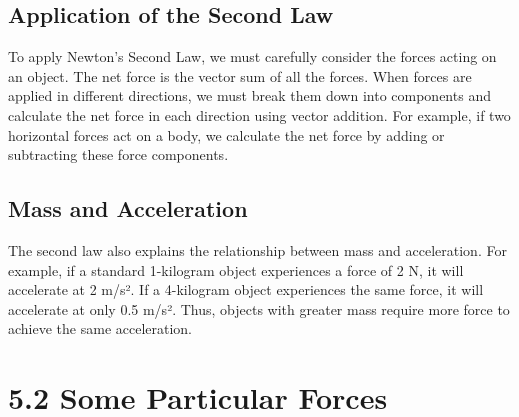 \documentclass{article}
\begin{document}
\subsection*{Application of the Second Law}
To apply Newton's Second Law, we must carefully consider the forces acting on an object. The net force is the vector sum of all the forces. When forces are applied in different directions, we must break them down into components and calculate the net force in each direction using vector addition. For example, if two horizontal forces act on a body, we calculate the net force by adding or subtracting these force components.

\subsection*{Mass and Acceleration}
The second law also explains the relationship between mass and acceleration. For example, if a standard 1-kilogram object experiences a force of 2 N, it will accelerate at 2 m/s². If a 4-kilogram object experiences the same force, it will accelerate at only 0.5 m/s². Thus, objects with greater mass require more force to achieve the same acceleration.

\section*{5.2 Some Particular Forces}
\end{document}
